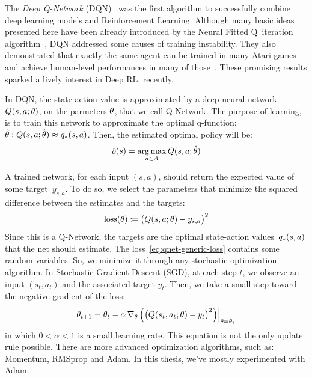 \label{sec:deep-q-agents}

The \emph{Deep Q-Network} (DQN)~\cite{bib:atari-deeprl} was the first algorithm to successfully
combine deep learning models and Reinforcement Learning. Although many basic
ideas presented here have been already introduced by the Neural Fitted
Q~iteration algorithm~\cite{bib:nfq}, DQN addressed some causes of training
instability. They also demonstrated that exactly the same agent can be trained
in many Atari games and achieve human-level performances in many of
those~\cite{bib:atari-deepq-nature}. These promising results sparked a lively
interest in Deep RL, recently.

In DQN, the state-action value is approximated by a deep neural network ${Q(s,
a; \theta)}$, on the parmeters $\theta$, that we call Q-Network. The purpose
of learning, is to train this network to approximate the optimal q-function: 
$\hat{\theta}: Q(s, a; \hat{\theta}) \approx {q}_*(s, a)$. Then, the
estimated optimal policy will be:
\begin{equation}
	\hat{\rho}(s) = \operatorname*{arg\,max}_{a \in A} Q(s, a; \hat{\theta})
\end{equation}

A trained network, for each input $(s, a)$, should return the expected value
of some target~$y_{s,a}$. To do so, we select the parameters that minimize the
squared difference between the estimates and the targets:
\begin{equation}
	\text{loss}(\theta) \coloneqq \bigl(Q(s, a; \theta) - y_{s,a} \bigr)^2
	\label{eq:qnet-generic-loss}
\end{equation}
Since this is a Q-Network, the targets are the optimal state-action
values~${q}_*(s, a)$ that the net should estimate.  The
loss~\eqref{eq:qnet-generic-loss} contains some random variables. So, we
minimize it through any stochastic optimization algorithm. In Stochastic
Gradient Descent (SGD), at each step $t$, we observe an input ${(s_t, a_t)}$ and the
associated target $y_t$. Then, we take a small step toward the negative
gradient of the loss:
\begin{equation}
	\theta_{t+1} = \theta_t - \alpha\, \nabla_{\theta}\,
	\Bigl( \bigl(Q(s_t, a_t; \theta) - y_t \bigr)^2 \Bigr) \Big|_{\theta =
	\theta_t}
	\label{eq:sgd-update}
\end{equation}
in which $0 < \alpha < 1$ is a small learning rate. This equation is not
the only update rule possible. There are more advanced optimization
algorithms, such as: Momentum, RMSprop and Adam. In this thesis, we've
mostly experimented with Adam.

